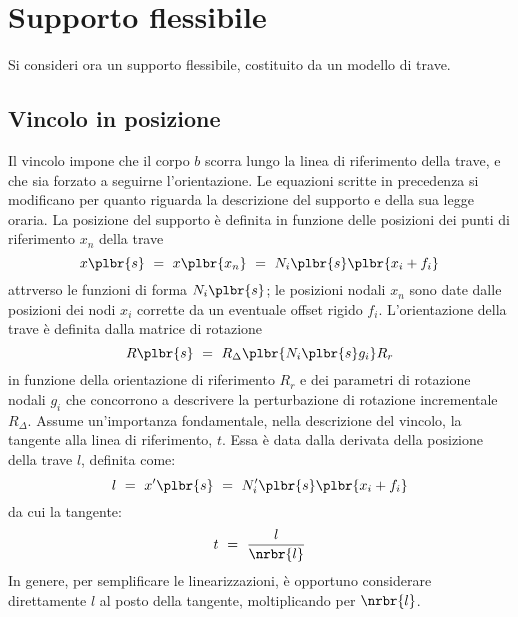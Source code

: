\documentclass[12pt,dvips,fleqn,italian]{article}
\begin{document}
\section*{Supporto flessibile}
Si consideri ora un supporto flessibile, costituito da un modello di trave.

\subsection*{Vincolo in posizione}
Il vincolo impone che il corpo $b$ scorra lungo la linea di riferimento
della trave, e che sia forzato a seguirne l'orientazione.
Le equazioni scritte in precedenza si modificano per quanto riguarda la
descrizione del supporto e della sua legge oraria.
La posizione del supporto \`{e} definita in funzione delle posizioni
dei punti di riferimento $ x_n $ della trave 
\begin{displaymath}
    x\plbr{s} \ = \ x\plbr{x_n} \ = \ N_i\plbr{s}\plbr{x_i + f_i}
\end{displaymath}
attrverso le funzioni di forma $N_i\plbr{s}$; le posizioni nodali
$x_n$ sono date dalle posizioni dei nodi $x_i$ corrette 
da un eventuale offset rigido $f_i$.
L'orientazione della trave \`{e} definita dalla matrice di rotazione
\begin{displaymath}
    R\plbr{s} \ = \ R_{\Delta}\plbr{ N_i\plbr{s} g_i } R_r 
\end{displaymath}
in funzione della orientazione di riferimento $R_r$ e dei parametri di
rotazione nodali $g_i$ che concorrono a descrivere la perturbazione di
rotazione incrementale $R_{\Delta}$.
Assume un'importanza fondamentale, nella descrizione del vincolo,
la tangente alla linea di riferimento, $ t $.
Essa \`e data dalla derivata della posizione della trave $ l $, definita
come:
\begin{displaymath}
    l \ = \ x'\plbr{s} \ = \ N'_i\plbr{s}\plbr{x_i + f_i}
\end{displaymath}
da cui la tangente:
\begin{displaymath}
    t \ = \ \frac{l}{\nrbr{l}}
\end{displaymath}
In genere, per semplificare le linearizzazioni, \`e opportuno considerare
direttamente $ l $ al posto della tangente, moltiplicando per
$ \nrbr{l} $.
\end{document}
